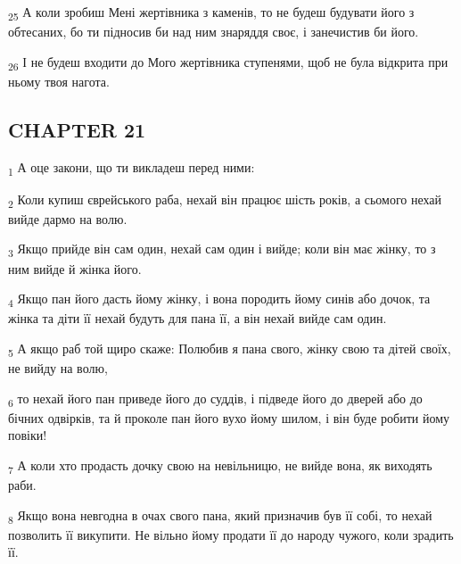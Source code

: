 \begin{tcolorbox}
\textsubscript{25} А коли зробиш Мені жертівника з каменів, то не будеш будувати його з обтесаних, бо ти підносив би над ним знаряддя своє, і занечистив би його.
\end{tcolorbox}
\begin{tcolorbox}
\textsubscript{26} І не будеш входити до Мого жертівника ступенями, щоб не була відкрита при ньому твоя нагота.
\end{tcolorbox}
\subsection{CHAPTER 21}
\begin{tcolorbox}
\textsubscript{1} А оце закони, що ти викладеш перед ними:
\end{tcolorbox}
\begin{tcolorbox}
\textsubscript{2} Коли купиш єврейського раба, нехай він працює шість років, а сьомого нехай вийде дармо на волю.
\end{tcolorbox}
\begin{tcolorbox}
\textsubscript{3} Якщо прийде він сам один, нехай сам один і вийде; коли він має жінку, то з ним вийде й жінка його.
\end{tcolorbox}
\begin{tcolorbox}
\textsubscript{4} Якщо пан його дасть йому жінку, і вона породить йому синів або дочок, та жінка та діти її нехай будуть для пана її, а він нехай вийде сам один.
\end{tcolorbox}
\begin{tcolorbox}
\textsubscript{5} А якщо раб той щиро скаже: Полюбив я пана свого, жінку свою та дітей своїх, не вийду на волю,
\end{tcolorbox}
\begin{tcolorbox}
\textsubscript{6} то нехай його пан приведе його до суддів, і підведе його до дверей або до бічних одвірків, та й проколе пан його вухо йому шилом, і він буде робити йому повіки!
\end{tcolorbox}
\begin{tcolorbox}
\textsubscript{7} А коли хто продасть дочку свою на невільницю, не вийде вона, як виходять раби.
\end{tcolorbox}
\begin{tcolorbox}
\textsubscript{8} Якщо вона невгодна в очах свого пана, який призначив був її собі, то нехай позволить її викупити. Не вільно йому продати її до народу чужого, коли зрадить її.
\end{tcolorbox}
